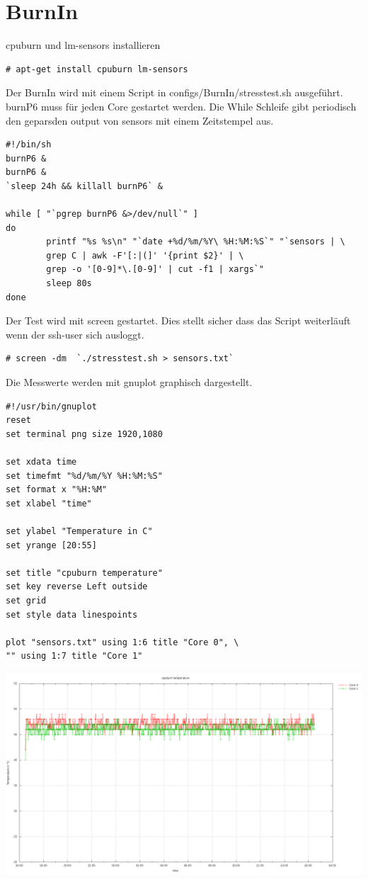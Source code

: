 \section{BurnIn}
cpuburn und lm-sensors installieren 
\begin{lstlisting}[style=Bash]
# apt-get install cpuburn lm-sensors
\end{lstlisting}
Der BurnIn wird mit einem Script in configs/BurnIn/stresstest.sh ausgeführt.\\
burnP6 muss für jeden Core gestartet werden. Die While Schleife gibt periodisch den geparsden output von sensors mit einem Zeitstempel aus.
\begin{lstlisting}[style=Bash]
#!/bin/sh
burnP6 &
burnP6 &
`sleep 24h && killall burnP6` &

while [ "`pgrep burnP6 &>/dev/null`" ]
do
        printf "%s %s\n" "`date +%d/%m/%Y\ %H:%M:%S`" "`sensors | \
		grep C | awk -F'[:|(]' '{print $2}' | \
		grep -o '[0-9]*\.[0-9]' | cut -f1 | xargs`"
        sleep 80s
done
\end{lstlisting}
Der Test wird mit screen gestartet. Dies stellt sicher dass das Script weiterläuft wenn der ssh-user sich ausloggt.
\begin{lstlisting}[style=Bash]
# screen -dm  `./stresstest.sh > sensors.txt`
\end{lstlisting}
Die Messwerte werden mit gnuplot graphisch dargestellt.
\begin{lstlisting}[style=Bash]
#!/usr/bin/gnuplot
reset
set terminal png size 1920,1080

set xdata time
set timefmt "%d/%m/%Y %H:%M:%S"
set format x "%H:%M"
set xlabel "time"

set ylabel "Temperature in C"
set yrange [20:55]

set title "cpuburn temperature"
set key reverse Left outside
set grid
set style data linespoints

plot "sensors.txt" using 1:6 title "Core 0", \
"" using 1:7 title "Core 1"
\end{lstlisting}
\includegraphics[width=\textwidth,height=\textheight,keepaspectratio]{../aufgabe1/BurnIn/plot.png}
